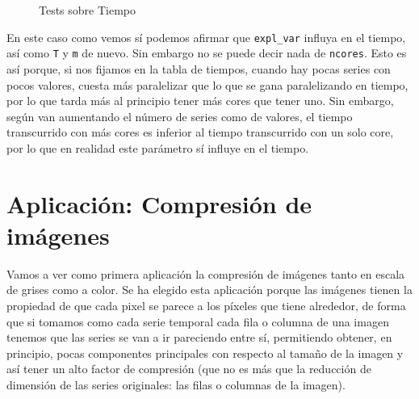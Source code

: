 \begin{figure}
 \centering
    \newline
    \centering
 \caption{Tests sobre Tiempo}
 \label{f:anova2}
\end{figure}

En este caso como vemos sí podemos afirmar que \texttt{expl\_var} influya en el tiempo, así como \texttt{T} y \texttt{m} de nuevo. Sin embargo no se puede decir nada de \texttt{ncores}. Esto es así porque, si nos fijamos en la tabla de tiempos, cuando hay pocas series con pocos valores, cuesta más paralelizar que lo que se gana paralelizando en tiempo, por lo que tarda más al principio tener más cores que tener uno. Sin embargo, según van aumentando el número de series como de valores, el tiempo transcurrido con más cores es inferior al tiempo transcurrido con un solo core, por lo que en realidad este parámetro sí influye en el tiempo.


\section{Aplicación: Compresión de imágenes}

Vamos a ver como primera aplicación la compresión de imágenes tanto en escala de grises como a color. Se ha elegido esta aplicación porque las imágenes tienen la propiedad de que cada pixel se parece a los píxeles que tiene alrededor, de forma que si tomamos como cada serie temporal cada fila o columna de una imagen tenemos que las series se van a ir pareciendo entre sí, permitiendo obtener, en principio, pocas componentes principales con respecto al tamaño de la imagen y así tener un alto factor de compresión (que no es más que la reducción de dimensión de las series originales: las filas o columnas de la imagen).\\

